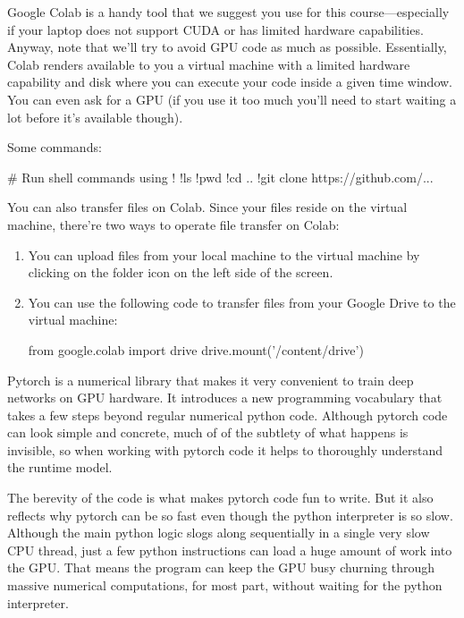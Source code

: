 \begin{observationblock}
    Google Colab is a handy tool that we suggest you use for this course---especially if your laptop does not support CUDA or has limited hardware capabilities. Anyway, note that we'll try to avoid GPU code as much as possible. Essentially, Colab renders available to you a virtual machine with a limited hardware capability and disk where you can execute your code inside a given time window. You can even ask for a GPU (if you use it too much you'll need to start waiting a lot before it's available though).
    
    Some commands:
    \begin{codeblock}[language=python]
# Run shell commands using !
!ls
!pwd
!cd ..
!git clone https://github.com/... 
    \end{codeblock}
    
    You can also transfer files on Colab. Since your files reside on the virtual machine, there're two ways to operate file transfer on Colab:
    \begin{enumerate}
\item You can upload files from your local machine to the virtual machine by clicking on the folder icon on the left side of the screen.
\item You can use the following code to transfer files from your Google Drive to the virtual machine:
    \begin{codeblock}[language=python]
from google.colab import drive
drive.mount('/content/drive')
    \end{codeblock}
    \end{enumerate}
\end{observationblock}

Pytorch is a numerical library that makes it very convenient to train deep networks on GPU hardware. It introduces a new programming vocabulary that takes a few steps beyond regular numerical python code. Although pytorch code can look simple and concrete, much of of the subtlety of what happens is invisible, so when working with pytorch code it helps to thoroughly understand the runtime model.

The berevity of the code is what makes pytorch code fun to write.  But it also reflects why pytorch can be so fast even though the python interpreter is so slow. Although the main python logic slogs along sequentially in a single very slow CPU thread, just a few python instructions can load a huge amount of work into the GPU.  That means the program can keep the GPU busy churning through massive numerical computations, for most part, without waiting for the python interpreter.


